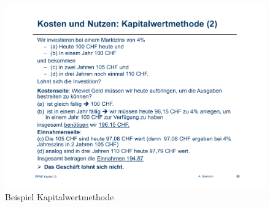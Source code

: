 \begin{figure}
\centering
\includegraphics[width=\linewidth]{fig/kapitalwertmethode}
\caption{Beispiel Kapitalwertmethode}
\label{fig:kapitalwertmethode}
\end{figure}
